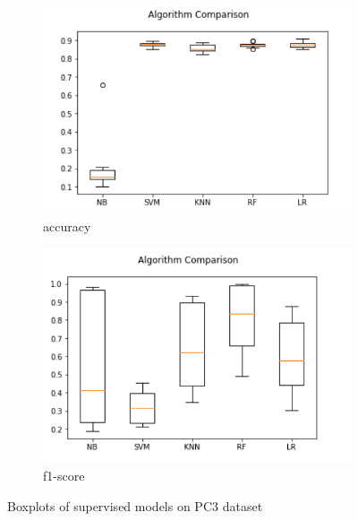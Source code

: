 \begin{figure}[h!]
  \centering
  \begin{subfigure}[b]{0.4\linewidth}
    \includegraphics[width=\linewidth]{report/PC3.png}
    \caption{accuracy}
  \end{subfigure}
  \begin{subfigure}[b]{0.4\linewidth}
    \includegraphics[width=\linewidth]{report/PC3_f.png}
    \caption{f1-score}
  \end{subfigure}
  \caption{Boxplots of supervised models on PC3 dataset}
\end{figure}

\pagebreak

